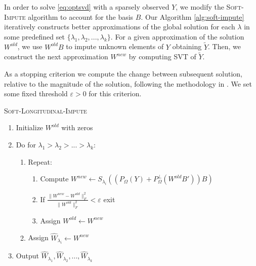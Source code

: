 \documentclass[preprint]{imsart}
\numberwithin{equation}{section}
\theoremstyle{plain}
\begin{document}
In order to solve \eqref{eq:optsvd} with a sparsely observed  $Y$, we modify the \textsc{Soft-Impute} algorithm  to account for the basis $B$. Our Algorithm \ref{alg:soft-impute} iteratively constructs better approximations of the global solution for each $\lambda$ in some predefined set $\{\lambda_1, \lambda_2, ..., \lambda_k\}$. For a given approximation of the solution $W^{old}$, we use $W^{old}B$ to impute unknown elements of $Y$ obtaining $\tilde{Y}$. Then, we construct the next approximation $W^{new}$ by computing SVT of $\tilde{Y}$.


As a stopping criterion we compute the change between subsequent solution, relative to the magnitude of the solution, following the methodology in \cite{cai2010singular}. We set some fixed threshold $\varepsilon > 0$ for this criterion.

\begin{algorithm}
\caption{\textsc{Soft-Longitudinal-Impute}\label{alg:soft-impute}}
\begin{enumerate}
\item Initialize $W^{old}$ with zeros
\item Do for $\lambda_1 > \lambda_2 > ... > \lambda_k$:
\begin{enumerate}
\item Repeat:
\begin{enumerate}
\item Compute $W^{new} \leftarrow S_{\lambda_i}( (P_\Omega(Y) + P_\Omega^\perp(W^{old}B'))B )$
\item If $\frac{\|W^{new} - W^{old}\|_F^2}{\|W^{old}\|_F^2} < \varepsilon$ exit
\item Assign $W^{old} \leftarrow W^{new}$
\end{enumerate}
\item Assign $\hat{W}_{\lambda_i} \leftarrow W^{new}$
\end{enumerate}
\item Output $\hat{W}_{\lambda_1}, \hat{W}_{\lambda_2}, ... , \hat{W}_{\lambda_k}$
\end{enumerate}
\end{algorithm}
\end{document}
